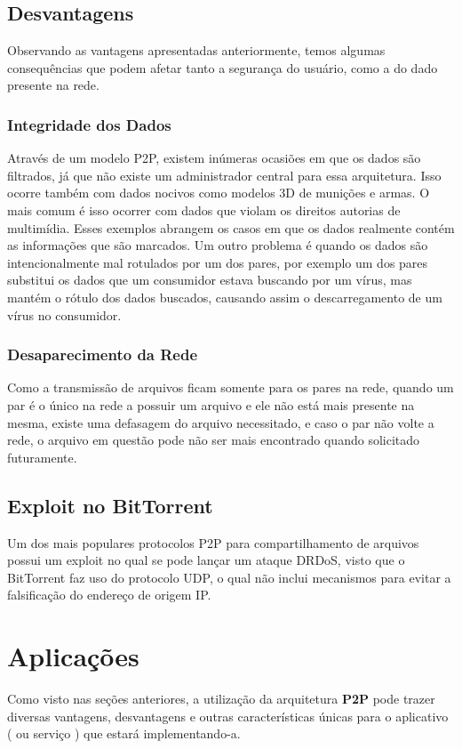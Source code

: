 \documentclass[a4paper]{article}
\begin{document}
\subsection{Desvantagens}
Observando as vantagens apresentadas anteriormente, temos algumas consequências que podem afetar tanto a segurança do usuário, como a do dado presente na rede.

\subsubsection{Integridade dos Dados}
Através de um modelo P2P, existem inúmeras ocasiões em que os dados são filtrados, já que não existe um administrador central para essa arquitetura. Isso ocorre também com dados nocivos como modelos 3D de munições e armas. O mais comum é isso ocorrer com dados que violam os direitos autorias de multimídia. Esses exemplos abrangem os casos em que os dados realmente contém as informações que são marcados. Um outro problema é quando os dados são intencionalmente mal rotulados por um dos pares, por exemplo um dos pares substitui os dados que um consumidor estava buscando por um vírus, mas mantém o rótulo dos dados buscados, causando assim o descarregamento de um vírus no consumidor.

\subsubsection{Desaparecimento da Rede}
Como a transmissão de arquivos ficam somente para os pares na rede, quando um par é o único na rede a possuir um arquivo e ele não está mais presente na mesma, existe uma defasagem do arquivo necessitado, e caso o par não volte a rede, o arquivo em questão pode não ser mais encontrado quando solicitado futuramente.

\subsection{Exploit no BitTorrent}
Um dos mais populares protocolos P2P para compartilhamento de arquivos possui um exploit no qual se pode lançar um ataque DRDoS, visto que o BitTorrent faz uso do protocolo UDP, o qual não inclui mecanismos para evitar a falsificação do endereço de origem IP.\cite{BitExploit}

\section{Aplicações}
Como visto nas seções anteriores, a utilização da arquitetura \textbf{P2P} pode trazer diversas vantagens, desvantagens e outras características únicas para o aplicativo ( ou serviço ) que estará implementando-a. 
\end{document}
